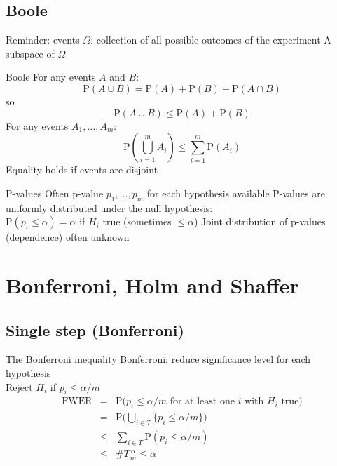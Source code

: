 \subsection{Boole}

\begin{frame}{Reminder: events}
    $\Omega$: collection of all possible outcomes of the experiment
  \eb
    A subspace of $\Omega$
  \eb
  \centering
{}
\end{frame}

\begin{frame}{Boole}
    For any events $A$ and $B$:
    \[ \mathrm{P}(A \cup B) = \mathrm{P}(A) + \mathrm{P}(B) - \mathrm{P}(A \cap B) \]
    so
    \[ \mathrm{P}(A \cup B) \leq \mathrm{P}(A) + \mathrm{P}(B) \]
    For any events $A_1, \ldots, A_m$:
    \[ \mathrm{P}(\bigcup_{i=1}^m A_i) \leq \sum_{i=1}^m \mathrm{P}(A_i) \]
  \eb
    Equality holds if events are disjoint
  \eb
\end{frame}


\begin{frame}{P-values}
    Often p-value $p_1,\ldots,p_m$ for each hypothesis available
  \eb
    P-values are uniformly distributed under the null hypothesis:\\
    $\mathrm{P}(p_i \leq \alpha) = \alpha$ if $H_i$ true (sometimes $\leq \alpha$)
  \eb
    Joint distribution of p-values (dependence) often unknown
  \eb
\end{frame}


\section{Bonferroni, Holm and Shaffer}
\subsection{Single step (Bonferroni)}

\begin{frame}{The Bonferroni inequality}
    Bonferroni: reduce significance level for each hypothesis
    \\ Reject $H_i$ if $p_i \leq \alpha/m$
  \eb
    \begin{eqnarray*}
    \mathrm{FWER} &=& \mathrm{P} \big(\textrm{$p_i \leq \alpha/m$ for at least one $i$ with $H_i$ true} \big) \\
    &=& \mathrm{P} \Big( \bigcup_{i\in T} \{p_i \leq \alpha/m\} \Big) \\
    &\leq& \sum_{i \in T} \mathrm{P} (p_i \leq \alpha/m) \\
    &\leq& \#T\frac{\alpha}{m} \leq \alpha
    \end{eqnarray*}
  \eb
\end{frame}


